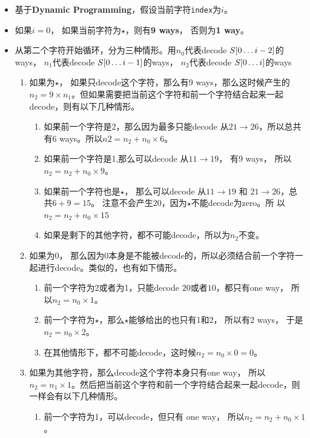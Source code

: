 \documentclass[a4paper,12pt]{article}
\begin{document}
\begin{CJK*}{UTF8}{gbsn}
	\begin{itemize}
		\item 基于\textbf{Dynamic Programming}，假设当前字符\texttt{index}为$i$。 
		\item 如果$i=0$， 如果当前字符为$\star$，则有\textbf{9 ways}， 否则为\textbf{1 way}。
		\item 从第二个字符开始循环，分为三种情形。用$n_0$代表decode $S[0\mathellipsis i-2]$的ways， $n_1$代表decode $S[0\mathellipsis i-1]$的ways， $n_2$代表decode $S[0\mathellipsis i]$的ways
		\begin{enumerate}
			\item 如果为$\star$， 如果只decode这个字符，那么有9 ways，那么这时候产生的$n_2 = 9\times n_1$。但如果需要把当前这个字符和前一个字符结合起来一起decode，则有以下几种情形。
				\begin{enumerate}
					\item 如果前一个字符是2，那么因为最多只能decode 从$21\rightarrow 26$，所以总共有6 ways。所以$n2 = n_2 + n_0 \times 6$。
					\item 如果前一个字符是1,那么可以decode 从$11\rightarrow 19$， 有9 ways， 所以$n_2 = n_2 + n_0\times 9$。
					\item 如果前一个字符也是$\star$， 那么可以decode 从$11\rightarrow 19$ 和 $21\rightarrow 26$，总共$6+9=15$。 注意不会产生$20$，因为$\star$不能decode为zero。所 以$n_2 = n_2 + n_0\times 15$
					\item 如果是剩下的其他字符，都不可能decode，所以为$n_2$不变。
				\end{enumerate}		
			\item 如果为0， 那么因为0本身是不能被decode的，所以必须结合前一个字符一起进行decode。类似的，也有如下情形。
				\begin{enumerate}
					\item 前一个字符为2或者为1，只能decode $20$或者$10$，都只有one way， 所以$n_2 = n_0 \times 1$。
					\item 前一个字符为$\star$，那么$\star$能够给出的也只有1和2， 所以有2 ways， 于是$n_2 = n_0 \times 2$。
					\item 在其他情形下，都不可能decode，这时候$n_2 = n_0 \times 0 = 0$。
				\end{enumerate}
			\item 如果为其他字符，那么decode这个字符本身只有one way， 所以$n_2 = n_1 \times 1$。然后把当前这个字符和前一个字符结合起来一起decode，则一样会有以下几种情形。
				\begin{enumerate}
					\item 前一个字符为1，可以decode，但只有 one way， 所以$n_2 = n_2 + n_0 \times 1$。

\end{enumerate}
\end{enumerate}
\end{itemize}
\end{CJK*}
\end{document}
